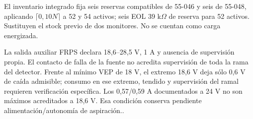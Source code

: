 El inventario integrado fija seis reservas compatibles de 55-046 y seis de 55-048, aplicando $\lceil0,10N\rceil$ a 52 y 54 activos; seis EOL 39 k$\Omega$ de reserva para 52 activos. Sustituyen el stock previo de dos monitores. No se cuentan como carga energizada.

La salida auxiliar FRPS declara 18,6--28,5 V, 1 A y ausencia de supervisión propia. El contacto de falla de la fuente no acredita supervisión de toda la rama del detector. Frente al mínimo VEP de 18 V, el extremo 18,6 V deja sólo 0,6 V de caída admisible; consumo en ese extremo, tendido y supervisión del ramal requieren verificación específica. Los 0,57/0,59 A documentados a 24 V no son máximos acreditados a 18,6 V. Esa condición conserva pendiente alimentación/autonomía de aspiración.\parencites[pp.~1--2]{lote33-frps}[p.~2]{lote30-vep36106}.
